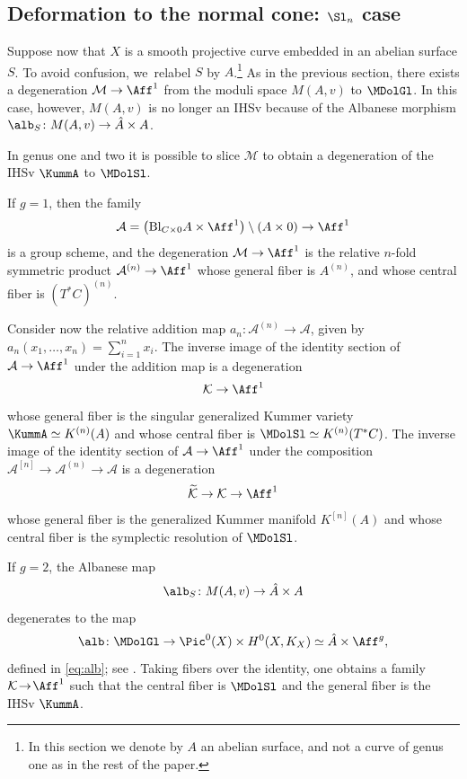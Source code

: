 \subsection{Deformation to the normal cone: $\Sl_n$ case}
Suppose now that $X$ is a smooth projective curve embedded in an abelian surface $S$. To avoid confusion, we~relabel $S$ by $A$.\footnote{In this section we denote by $A$ an abelian surface, and not a curve of genus one as in the rest of the paper.} As in the previous section, there exists a degeneration $\mathcal{M} \to \Aff^1$ from the moduli space $M(A,v)$ to $\MDolGl$. In this case, however, $M(A,v)$ is no longer an IHSv because of the Albanese morphism
$\alb_S\colon M(A,v) \to \hat{A} \times A $.

In genus one and two it is possible to slice $\mathcal{M}$ to obtain a degeneration of the IHSv $\KummA$ to $\MDolSl$.
\begin{exa}\label{genusonekummer}
If $g=1$, then the family
\[
\mathcal{A}=\left(\mathrm{Bl}_{C\times 0}A\times \Aff^1\right)\setminus \left( A\times 0\right)\to \Aff^1
\]
is a group scheme, and the degeneration $\mathcal{M} \to \Aff^1$ is the relative $n$-fold symmetric product $\mathcal{A}^{(n)} \to \Aff^1$ whose general fiber is $A^{(n)}$, and whose central fiber is $(T^*C)^{(n)}$.

Consider now the relative addition map $a_n\colon \mathcal{A}^{(n)} \to \mathcal{A}$, given by $a_n(x_1, \ldots, x_n)= \sum_{i=1}^{n}x_i$. The inverse image of the identity section of $\mathcal{A} \to \Aff^1$ under the addition map is a degeneration
\[
\mathcal{K} \to \Aff^1
\]
whose general fiber is the singular generalized Kummer variety $\KummA \simeq K^{(n)}(A)$ and whose central fiber is $\MDolSl \simeq K^{(n)}(T^*C)$. The inverse image of the identity section of $\mathcal{A} \to \Aff^1$ under the composition $\mathcal{A}^{[n]} \to \mathcal{A}^{(n)} \to \mathcal{A}$ is a degeneration
\[
\widetilde{\mathcal{K}} \to \mathcal{K} \to \Aff^1
\]
whose general fiber is the generalized Kummer manifold $K^{[n]}(A)$ and whose central fiber is the symplectic resolution of $\MDolSl$.
\end{exa}
\begin{exa}\label{ex:genus2}
If $g=2$, the Albanese map \cite{Yoshioka2001}
\[
\alb_S\colon M(A,v) \to \hat{A} \times A
\]
degenerates to the map
\[
\alb\colon \MDolGl \to \Pic^0(X) \times H^0(X, K_X) \simeq \hat{A} \times \Aff^{g},
\]
defined in \eqref{eq:alb}; see \cite[\S 4]{deCataldoMaulikShen2020}.
Taking fibers over the identity, one obtains a family \hbox{$\mathcal{K}\!\to\! \Aff^1$} such that the central fiber is $\MDolSl$ and the general fiber is the IHSv $\KummA$.
\end{exa}
